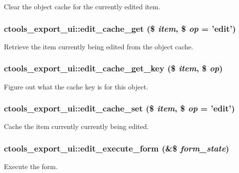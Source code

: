 \label{classctools__export__ui_a9e88dcc95bc69ece09769f9994aec449}
Clear the object cache for the currently edited item. \hypertarget{classctools__export__ui_a04faa907c3f7c0823c44221c5bf40ad8}{
\subsubsection[{edit\_\-cache\_\-get}]{\setlength{\rightskip}{0pt plus 5cm}ctools\_\-export\_\-ui::edit\_\-cache\_\-get (\$ {\em item}, \/  \$ {\em op} = {\ttfamily 'edit'})}}
\label{classctools__export__ui_a04faa907c3f7c0823c44221c5bf40ad8}
Retrieve the item currently being edited from the object cache. \hypertarget{classctools__export__ui_a45308950ec010fcbe8ebbb100bba2175}{
\subsubsection[{edit\_\-cache\_\-get\_\-key}]{\setlength{\rightskip}{0pt plus 5cm}ctools\_\-export\_\-ui::edit\_\-cache\_\-get\_\-key (\$ {\em item}, \/  \$ {\em op})}}
\label{classctools__export__ui_a45308950ec010fcbe8ebbb100bba2175}
Figure out what the cache key is for this object. \hypertarget{classctools__export__ui_a6c51164bf094804268b78151c49b6b89}{
\subsubsection[{edit\_\-cache\_\-set}]{\setlength{\rightskip}{0pt plus 5cm}ctools\_\-export\_\-ui::edit\_\-cache\_\-set (\$ {\em item}, \/  \$ {\em op} = {\ttfamily 'edit'})}}
\label{classctools__export__ui_a6c51164bf094804268b78151c49b6b89}
Cache the item currently currently being edited. \hypertarget{classctools__export__ui_a211541eb41cf4817f0912b27f7c7762c}{
\subsubsection[{edit\_\-execute\_\-form}]{\setlength{\rightskip}{0pt plus 5cm}ctools\_\-export\_\-ui::edit\_\-execute\_\-form (\&\$ {\em form\_\-state})}}
\label{classctools__export__ui_a211541eb41cf4817f0912b27f7c7762c}
Execute the form.

